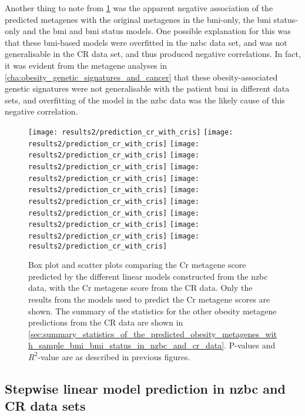 Another thing to note from \cref{fig:predict_cr_cris} was the apparent negative association of the predicted metagenes with the original metagenes in the \gls{bmi}-only, the \gls{bmi} status-only and the \gls{bmi} and \gls{bmi} status models.
One possible explanation for this was that these \gls{bmi}-based models were overfitted in the \gls{nzbc} data set, and was not generalisable in the CR data set, and thus produced negative correlations.
In fact, it was evident from the metagene analyses in \cref{cha:obesity_genetic_signatures_and_cancer} that these obesity-associated genetic signatures were not generalisable with the patient \gls{bmi} in different data sets, and overfitting of the model in the \gls{nzbc} data was the likely cause of this negative correlation.

\begin{figure}[htpb]
	\centering
	\texttt{[image: results2/prediction\_cr\_with\_cris]}
	\texttt{[image: results2/prediction\_cr\_with\_cris]}
	\texttt{[image: results2/prediction\_cr\_with\_cris]}
	\texttt{[image: results2/prediction\_cr\_with\_cris]}
	\texttt{[image: results2/prediction\_cr\_with\_cris]}
	\texttt{[image: results2/prediction\_cr\_with\_cris]}
	\texttt{[image: results2/prediction\_cr\_with\_cris]}
	\texttt{[image: results2/prediction\_cr\_with\_cris]}
	\texttt{[image: results2/prediction\_cr\_with\_cris]}
	\texttt{[image: results2/prediction\_cr\_with\_cris]}
	\texttt{[image: results2/prediction\_cr\_with\_cris]}
	\caption[Comparison of the predicted Cr metagene scores with the Cr metagene score from the CR data]{ Box plot and scatter plots comparing the Cr metagene score predicted by the different linear models constructed from the \gls{nzbc} data, with the Cr metagene score from the CR data.
	Only the results from the models used to predict the Cr metagene scores are shown.
	The summary of the statistics for the other obesity metagene predictions from the CR data are shown in \cref{sec:summary_statistics_of_the_predicted_obesity_metagenes_with_sample_bmi_bmi_status_in_nzbc_and_cr_data}.
	P-values and $R^2$-value are as described in previous figures.
	}
	\label{fig:predict_cr_cris}
\end{figure}

\subsection{Stepwise linear model prediction in \gls{nzbc} and CR data sets}
\label{sub:stepwise_linear_model_prediction_in_nzbc_and_cr_data_sets}


